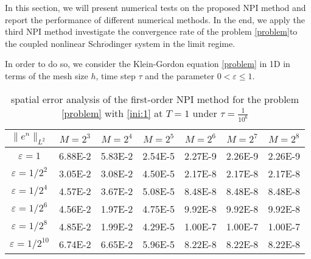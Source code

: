 \documentclass[final,leqno,showlabe]{siamltex}
\begin{document}
In this section, we will present numerical tests on the proposed NPI method and report the performance of different numerical methods. In the end, we apply the third NPI method investigate the convergence rate of the problem \eqref{problem}to the coupled nonlinear Schr$\ddot{o}$dinger system in the limit regime. 

In order to do so, we consider the Klein-Gordon equation \eqref{problem} in 1D in terms of the mesh size $h$, time step $\tau$ and the parameter $0< \varepsilon\leq 1$.

\begin{table}[tbhp]
{\footnotesize
  \caption{spatial error analysis of the first-order NPI method for the problem \eqref{problem} with \ref{ini:1} at $T=1$ under $\tau=\frac{1}{10^6}$}\label{tab:spatialone}
\begin{center}
\begin{tabular}{|c|c|c|c|c|c|c|}
     \hline
     $\|e^n\|_{L^2}$ &$M=2^3$ &$M=2^4$ &$M=2^5$& $M=2^6$&$M=2^7$&$M=2^8$\\
     \hline
     $\varepsilon=1$&     6.88E-2 &  5.83E-2   & 2.54E-5 &  2.27E-9 &  2.26E-9& 2.26E-9\\
     $\varepsilon=1/2^2$& 3.05E-2 & 3.08E-2  & 4.50E-5  & 2.17E-8  & 2.17E-8  & 2.17E-8\\
     $\varepsilon=1/2^4$& 4.57E-2 & 3.67E-2  & 5.08E-5  & 8.48E-8  & 8.48E-8 & 8.48E-8\\
     $\varepsilon=1/2^6$& 4.56E-2& 1.97E-2 & 4.75E-5   & 9.92E-8  & 9.92E-8 & 9.92E-8   \\
     $\varepsilon=1/2^8$& 4.85E-2& 1.99E-2 & 4.29E-5 & 1.00E-7 & 1.00E-7 & 1.00E-7   \\
     $\varepsilon=1/2^{10}$& 6.74E-2& 6.65E-2 & 5.96E-5 & 8.22E-8 & 8.22E-8 & 8.22E-8   \\
     \hline
\end{tabular}
\end{center}
}
\end{table}
\end{document}

